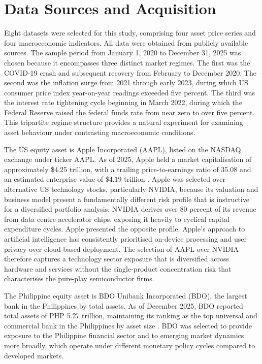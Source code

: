 \section{Data Sources and Acquisition}

Eight datasets were selected for this study, comprising four asset price series and four macroeconomic indicators. All data were obtained from publicly available sources. The sample period from January 1, 2020 to December 31, 2025 was chosen because it encompasses three distinct market regimes. The first was the COVID-19 crash and subsequent recovery from February to December 2020. The second was the inflation surge from 2021 through early 2023, during which US consumer price index year-on-year readings exceeded five percent. The third was the interest rate tightening cycle beginning in March 2022, during which the Federal Reserve raised the federal funds rate from near zero to over five percent. This tripartite regime structure provides a natural experiment for examining asset behaviour under contrasting macroeconomic conditions.

The US equity asset is Apple Incorporated (AAPL), listed on the NASDAQ exchange under ticker AAPL. As of 2025, Apple held a market capitalisation of approximately \$4.25 trillion, with a trailing price-to-earnings ratio of 35.08 and an estimated enterprise value of \$4.19 trillion \parencite{stockanalysis2025}. Apple was selected over alternative US technology stocks, particularly NVIDIA, because its valuation and business model present a fundamentally different risk profile that is instructive for a diversified portfolio analysis. NVIDIA derives over 80 percent of its revenue from data centre accelerator chips, exposing it heavily to cyclical capital expenditure cycles. Apple presented the opposite profile. Apple's approach to artificial intelligence has consistently prioritised on-device processing and user privacy over cloud-based deployment. The selection of AAPL over NVIDIA therefore captures a technology sector exposure that is diversified across hardware and services without the single-product concentration risk that characterises the pure-play semiconductor firms.

The Philippine equity asset is BDO Unibank Incorporated (BDO), the largest bank in the Philippines by total assets. As of December 2025, BDO reported total assets of PHP 5.27 trillion, maintaining its ranking as the top universal and commercial bank in the Philippines by asset size \parencite{bsp2025}. BDO was selected to provide exposure to the Philippine financial sector and to emerging market dynamics more broadly, which operate under different monetary policy cycles compared to developed markets.

